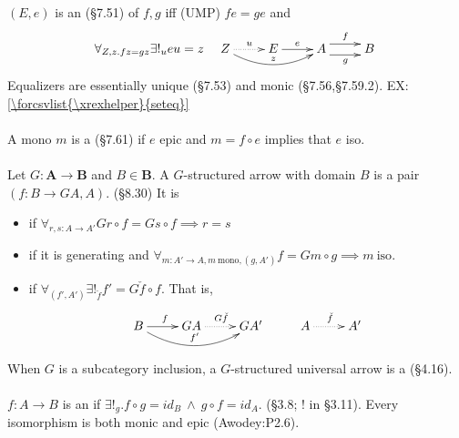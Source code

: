 \documentclass[10pt,twocolumn,letterpaper]{article}
\newcommand\xrexhelper[1]{ex:#1}
\newcommand{\xrex}[1]{EX: \ref{\forcsvlist{\xrexhelper}{#1}}}
\begin{document}
  \paragraph{}
  $(E,e)$ is an  (\S7.51) of $f,g$ iff (UMP) $fe = ge$ and
     \[\forall_{Z,z . fz = gz} \exists!_u eu = z \quad
     \xymatrix{
     Z \ar@{..>}[r]^u \ar@/_1pc/[rr]^{z} & E \ar[r]^e & A \ar@<1ex>[r]^f \ar@<-1ex>[r]_g & B \\
     }\]
  Equalizers are essentially unique (\S7.53) and monic (\S7.56,\S7.59.2).
  \xrex{seteq}

  \paragraph{}
  A mono $m$ is a  (\S7.61) if $e$ epic and
  $m = f \circ e$ implies that $e$ iso.

  \paragraph{}
  Let $G: \mathbf{A} \to \mathbf{B}$ and $B \in \mathbf{B}$.  A
   {$G$-structured arrow
  with domain $B$} is a pair $(f : B \to GA, A)$.  (\S8.30)  It is
  \begin{itemize}
    \item {} if $\forall_{r,s : A \to A'} Gr \circ f = Gs
      \circ f \implies r = s$
    \item {} if it is generating and $\forall_{m :
      A' \to A, m ~\text{mono}, (g,A')} f = Gm \circ g \implies m ~\text{iso}$.
	\item {} if
	$\forall_{(f', A')}
    \exists!_{\check f} f' = G{\check f} \circ f$.  That is,
    \[\xymatrix{
        B \ar[r]^f \ar@/_1.25pc/[rr]^{f'}
        & GA \ar@{.>}[r]^{G{\check f}}
        & GA'
        & A \ar@{.>}[r]^{\check f}
        & A'
    }\]
  \end{itemize}
  When $G$ is a subcategory inclusion, a $G$-structured universal arrow is
  a  (\S4.16).

  \paragraph{}
  $f : A \to B$ is an  if $\exists!_g . f \circ g = id_B
  ~\wedge~ g \circ f = id_A$. (\S3.8; ! in \S3.11).  Every isomorphism
  is both monic and epic (Awodey:P2.6).
\end{document}
